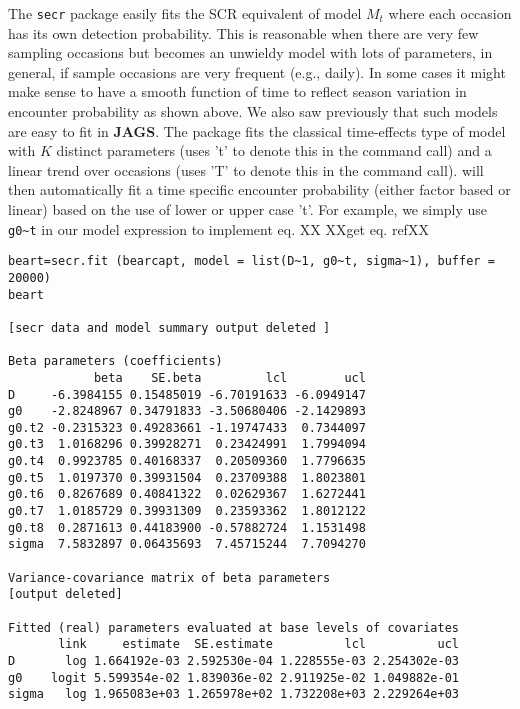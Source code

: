 The \mbox{\tt secr} package easily fits the SCR equivalent of model
$M_{t}$ where each
occasion has its own detection probability. This is reasonable when
there are very few sampling occasions but becomes an unwieldy model
with lots of parameters, in general, if sample occasions are very
frequent (e.g., daily). In some cases it might make sense to have a
smooth function of time to reflect season variation in encounter
probability as shown above. We also saw previously that such models are easy
to fit in {\bf JAGS}.  The package \secr fits the classical
time-effects type of model with $K$ distinct parameters (\secr uses 't' to denote
this in the command call) and a linear
trend over occasions (\secr uses 'T' to denote this in the command call).
\secr will then automatically fit a time
specific encounter probability (either factor based or linear) based on the use
of lower or upper case 't'.  For example, we simply use \verb+g0~t+ in
our model expression to implement eq. XX   XXget eq. refXX


{\small
\begin{verbatim}
beart=secr.fit (bearcapt, model = list(D~1, g0~t, sigma~1), buffer = 20000)
beart

[secr data and model summary output deleted ]

Beta parameters (coefficients)
            beta    SE.beta         lcl        ucl
D     -6.3984155 0.15485019 -6.70191633 -6.0949147
g0    -2.8248967 0.34791833 -3.50680406 -2.1429893
g0.t2 -0.2315323 0.49283661 -1.19747433  0.7344097
g0.t3  1.0168296 0.39928271  0.23424991  1.7994094
g0.t4  0.9923785 0.40168337  0.20509360  1.7796635
g0.t5  1.0197370 0.39931504  0.23709388  1.8023801
g0.t6  0.8267689 0.40841322  0.02629367  1.6272441
g0.t7  1.0185729 0.39931309  0.23593362  1.8012122
g0.t8  0.2871613 0.44183900 -0.57882724  1.1531498
sigma  7.5832897 0.06435693  7.45715244  7.7094270

Variance-covariance matrix of beta parameters
[output deleted]

Fitted (real) parameters evaluated at base levels of covariates
       link     estimate  SE.estimate          lcl          ucl
D       log 1.664192e-03 2.592530e-04 1.228555e-03 2.254302e-03
g0    logit 5.599354e-02 1.839036e-02 2.911925e-02 1.049882e-01
sigma   log 1.965083e+03 1.265978e+02 1.732208e+03 2.229264e+03
\end{verbatim}
}

